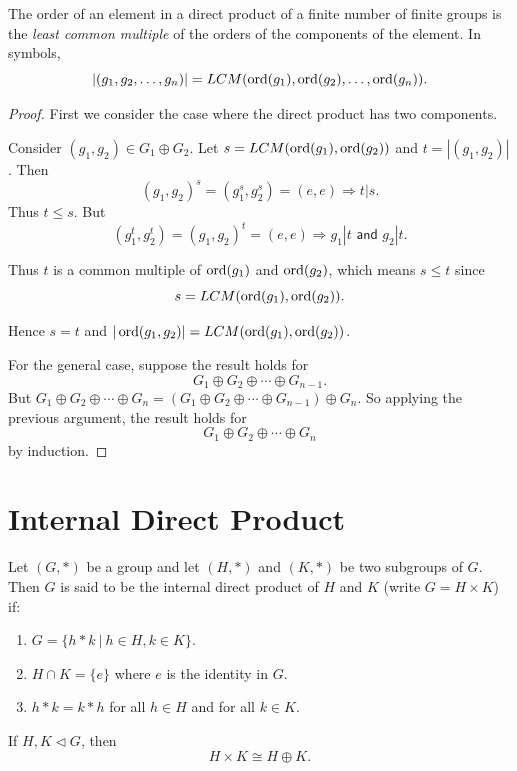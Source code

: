 \begin{theorem}
    The order of an element in a direct product of a finite number of finite groups is the 
    \textit{least common multiple} of the orders of the components of the element.
    In symbols,
    \[
        |(g_1, g_2, \ldots, g_n)| = LCM(\operatorname{ord}(g_1), \operatorname{ord}(g_2), \ldots, \operatorname{ord}(g_n)).
    \]
\end{theorem}
\begin{proof}
    First we consider the case where the direct product has two components. 
    
    Consider $(g_1, g_2) \in G_1 \oplus G_2$.
    Let $s = LCM(\operatorname{ord}(g_1), \operatorname{ord}(g_2))$ and $t = |(g_1, g_2)|$. Then
    \[
        (g_1, g_2)^s = (g_1^s, g_2^s) = (e, e) \Longrightarrow t|s.
    \]
    Thus $t \leq s$. But 
    \[
        (g_1^t, g_2^t) = (g_1, g_2)^t = (e,e) \Longrightarrow g_1 | t \textsf{ and } g_2 | t.
    \]

    Thus $t$ is a common multiple of $\operatorname{ord}(g_1)$ and $\operatorname{ord}(g_2)$, which means $s \leq t$ since 
    \[s = LCM(\operatorname{ord}(g_1), \operatorname{ord}(g_2)).\]
    
    Hence $s = t$ and $|\operatorname{ord}(g_1, g_2)| = LCM(\operatorname{ord}(g_1), \operatorname{ord}(g_2))$.

    For the general case, suppose the result holds for 
    \[
        G_1 \oplus G_2 \oplus \cdots \oplus G_{n-1}.
    \]
    But $G_1 \oplus G_2 \oplus \cdots \oplus G_n = (G_1 \oplus G_2 \oplus \cdots \oplus G_{n-1}) \oplus G_n$. So applying 
    the previous argument, the result holds for 
    \[
        G_1 \oplus G_2 \oplus \cdots \oplus G_{n}
    \]
    by induction.
\end{proof}

\section{Internal Direct Product}

\begin{definition}
    Let $(G, *)$ be a group and let $(H, *)$ and $(K, *)$ be two subgroups of $G$. Then 
    $G$ is said to be the internal direct product of $H$ and $K$ (write $G = H \times K$) if:
    \begin{enumerate}
        \item $G = \{ h * k \> | \> h \in H, k \in K \}$.
        \item $H \cap K = \{e\}$ where $e$ is the identity in $G$.
        \item $h * k = k* h$ for all $h \in H$ and for all $k \in K$.
    \end{enumerate}
\end{definition}
\begin{remark}
    If $H, K \triangleleft G$, then 
    \[
        H \times K \cong H \oplus K.
    \]
\end{remark}

